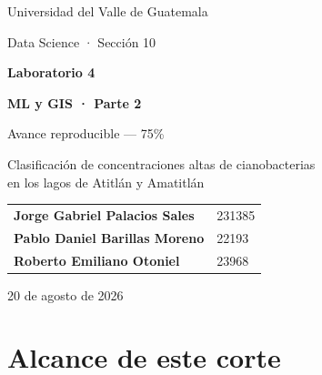 \documentclass[11pt,letterpaper]{article}
\begin{document}
\begin{titlepage}
\pagecolor{navy}\color{white}
\vspace*{1.2cm}
{\Large Universidad del Valle de Guatemala\par}
\vspace{0.25cm}
{\large Data Science · Sección 10\par}
\vfill
{\Huge\bfseries Laboratorio 4\par}
\vspace{0.25cm}
{\Huge\bfseries ML y GIS · Parte 2\par}
\vspace{0.65cm}
{\LARGE Avance reproducible — 75\%\par}
\vspace{0.8cm}
{\large Clasificación de concentraciones altas de cianobacterias\\
en los lagos de Atitlán y Amatitlán\par}
\vfill
\begin{tabular}{@{}ll@{}}
\textbf{Jorge Gabriel Palacios Sales} & 231385\\[4pt]
\textbf{Pablo Daniel Barillas Moreno} & 22193\\[4pt]
\textbf{Roberto Emiliano Otoniel} & 23968
\end{tabular}
\vfill
{\large 20 de agosto de 2026\par}
\end{titlepage}
\nopagecolor\color{black}

\begin{abstract}
Se construyó un conjunto de aprendizaje supervisado a nivel píxel--fecha con las 22 observaciones Sentinel-2 L2A de la Parte 1. Se descargaron diez bandas espectrales a 20 m, se aplicaron máscaras de calidad y agua, y se definió una respuesta binaria de concentración alta mediante un umbral de 100 000 células/mL. Para impedir fuga de información, se excluyeron CYA y todas las variables que participan directa o indirectamente en su ecuación. Se compararon regresión logística, Random Forest y Gradient Boosting bajo partición aleatoria 70/30, GroupKFold espacial, retención temporal y transferencia entre lagos. Gradient Boosting obtuvo ROC-AUC 0.999 y F1 0.957 en la prueba aleatoria, pero la retención temporal redujo su F1 a 0.665. Esta diferencia demuestra por qué la validación geográfica y temporal es necesaria.
\end{abstract}

\section{Alcance de este corte}
\end{document}
